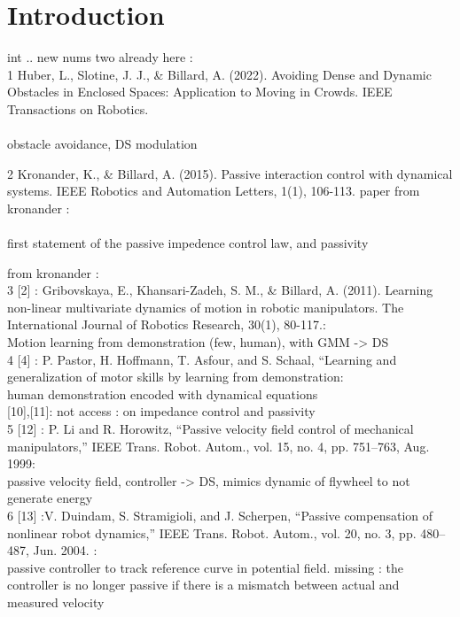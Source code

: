 \section{Introduction}
int .. new nums
two already here : \\
1 Huber, L., Slotine, J. J., \& Billard, A. (2022). Avoiding Dense and Dynamic Obstacles in Enclosed Spaces: Application to Moving in Crowds. IEEE Transactions on Robotics.\\
\\obstacle avoidance, DS modulation

2 Kronander, K., \& Billard, A. (2015). Passive interaction control with dynamical systems. IEEE Robotics and Automation Letters, 1(1), 106-113.
paper from kronander : \\
\\first statement of the passive impedence control law, and passivity

from kronander :\\

3 [2] : Gribovskaya, E., Khansari-Zadeh, S. M., \& Billard, A. (2011). Learning non-linear multivariate dynamics of motion in robotic manipulators. The International Journal of Robotics Research, 30(1), 80-117.: \\
Motion learning from demonstration (few, human), with GMM -> DS\\

4 [4] : P. Pastor, H. Hoffmann, T. Asfour, and S. Schaal, “Learning and generalization of motor skills by learning from demonstration:\\
human demonstration encoded with dynamical equations\\

[10],[11]: not access : on impedance control and passivity\\

5 [12] :  P. Li and R. Horowitz, “Passive velocity field control of mechanical
manipulators,” IEEE Trans. Robot. Autom., vol. 15, no. 4, pp. 751–763,
Aug. 1999:\\
passive velocity field, controller -> DS, mimics dynamic of flywheel to not generate energy\\

6 [13] :V. Duindam, S. Stramigioli, and J. Scherpen, “Passive compensation of
nonlinear robot dynamics,” IEEE Trans. Robot. Autom., vol. 20, no. 3,
pp. 480–487, Jun. 2004. : \\
passive controller to track reference curve in potential field. missing : the controller is no longer passive if there is a mismatch between actual and measured velocity

